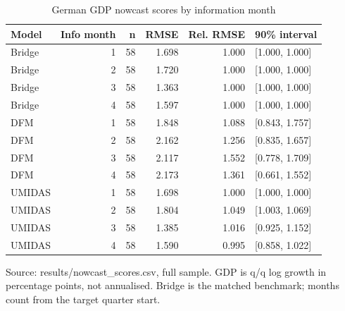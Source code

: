 \begin{table}[htbp]
\centering
\footnotesize
\caption{German GDP nowcast scores by information month}
\begin{tabularx}{\linewidth}{XrrrrX}
\toprule
Model & Info month & n & RMSE & Rel. RMSE & 90\% interval \\
\midrule
Bridge & 1 & 58 & 1.698 & 1.000 & [1.000, 1.000] \\
Bridge & 2 & 58 & 1.720 & 1.000 & [1.000, 1.000] \\
Bridge & 3 & 58 & 1.363 & 1.000 & [1.000, 1.000] \\
Bridge & 4 & 58 & 1.597 & 1.000 & [1.000, 1.000] \\
DFM & 1 & 58 & 1.848 & 1.088 & [0.843, 1.757] \\
DFM & 2 & 58 & 2.162 & 1.256 & [0.835, 1.657] \\
DFM & 3 & 58 & 2.117 & 1.552 & [0.778, 1.709] \\
DFM & 4 & 58 & 2.173 & 1.361 & [0.661, 1.552] \\
UMIDAS & 1 & 58 & 1.698 & 1.000 & [1.000, 1.000] \\
UMIDAS & 2 & 58 & 1.804 & 1.049 & [1.003, 1.069] \\
UMIDAS & 3 & 58 & 1.385 & 1.016 & [0.925, 1.152] \\
UMIDAS & 4 & 58 & 1.590 & 0.995 & [0.858, 1.022] \\
\bottomrule
\end{tabularx}
\par\vspace{3pt}\begin{minipage}{\linewidth}\footnotesize Source: results/nowcast\_\allowbreak{}scores.\allowbreak{}csv, full sample.\allowbreak{} GDP is q/q log growth in percentage points, not annualised.\allowbreak{} Bridge is the matched benchmark; months count from the target quarter start.\allowbreak{}\end{minipage}
\end{table}
